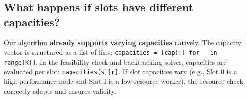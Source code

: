 \documentclass[11pt,a4paper]{article}
\begin{document}
\subsection{What happens if slots have different capacities?}
Our algorithm \textbf{already supports varying capacities} natively. The capacity vector is structured as a list of lists: \texttt{capacities = [cap[:] for \_ in range(K)]}. In the feasibility check and backtracking solver, capacities are evaluated per slot: \texttt{capacities[s][r]}. If slot capacities vary (e.g., Slot 0 is a high-performance node and Slot 1 is a low-resource worker), the resource check correctly adapts and ensures validity.
\end{document}
